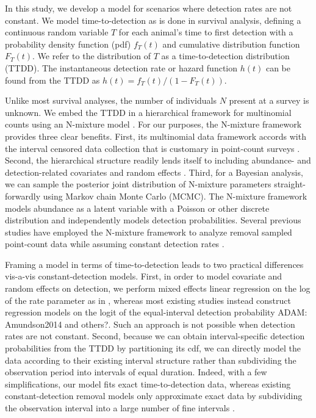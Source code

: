 \documentclass[useAMS,usenatbib,referee,12pt]{article}
\newcommand{\adam}[1]{{\color{blue} ADAM: #1}}
\begin{document}
In this study, we develop a model for scenarios where detection rates are not constant.  We model time-to-detection as is done in survival analysis, defining a continuous random variable $T$ for each animal's time to first detection with a probability density function (pdf) $f_T(t)$ and cumulative distribution function $F_T(t)$.  We refer to the distribution of $T$ as a time-to-detection distribution (TTDD).  The instantaneous detection rate or hazard function $h(t)$ can be found from the TTDD as $h(t) = f_T(t) / (1-F_T(t))$.

Unlike most survival analyses, the number of individuals $N$ present at a survey is unknown.  We embed the TTDD in a hierarchical framework for multinomial counts using an N-mixture model \citep{Wyatt2002, Royle2004NMixture}.  For our purposes, the N-mixture framework provides three clear benefits.  First, its multinomial data framework accords with the interval censored data collection that is customary in point-count surveys \citep{Ralph1995}.  Second, the hierarchical structure readily lends itself to including abundance- and detection-related covariates and random effects \citep{Dorazio2005, Etterson2009, Amundson2014}.  Third, for a Bayesian analysis, we can sample the posterior joint distribution of N-mixture parameters straight-forwardly using Markov chain Monte Carlo (MCMC).  The N-mixture framework models abundance as a latent variable with a Poisson or other discrete distribution and independently models detection probabilities.  Several previous studies have employed the N-mixture framework to analyze removal sampled point-count data while assuming constant detection rates \citep{Royle2004Generalized, Dorazio2005, Etterson2009, Solymos2013, Amundson2014}.  

Framing a model in terms of time-to-detection leads to two practical differences vis-a-vis constant-detection models.  First, in order to model covariate and random effects on detection, we perform mixed effects linear regression on the log of the rate parameter as in \citet{Solymos2013}, whereas most existing studies instead construct regression models on the logit of the equal-interval detection probability \adam{Amundson2014 and others?}.  Such an approach is not possible when detection rates are not constant.  Second, because we can obtain interval-specific detection probabilities from the TTDD by partitioning its cdf, we can directly model the data according to their existing interval structure rather than subdividing the observation period into intervals of equal duration.  Indeed, with a few simplifications, our model fits exact time-to-detection data, whereas existing constant-detection removal models only approximate exact data by subdividing the observation interval into a large number of fine intervals \citep{Reidy2011, Amundson2014}.
\end{document}
